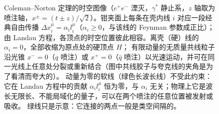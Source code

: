 \begin{figure}[htbp]
\begin{tikzpicture}
\end{tikzpicture}
\caption{Coleman--Norton 定理的时空图像（$e^+e^-$ 湮灭，$\gamma^*$ 静止系，$z$ 轴取为喷注轴，$x^\pm=(t\pm z)/\sqrt2$）。钳夹面上每条在壳内线 $i$
对应一段经典自由传播 $\Delta x_i^\mu=\alpha_i l_i^\mu$（$\alpha_i\ge0$，与该线的 Feynman 参数成正比）；由 Landau 方程，各顶点的时空位置彼此相容。离壳（硬）线的 $\alpha_i=0$，全部收缩为原点处的硬顶点 $H$；
有限动量的无质量共线粒子沿光锥 $x^-=0$（$q$ 喷注）或 $x^+=0$（$\bar q$ 喷注）以光速运动，并可在同一光线上任意处分裂或重新结合（图中共线胶子与夸克线的夹角是为了看清而夸大的）。
动量为零的软线（绿色长波长线）不受此约束：它在 Landau 方程中的贡献 $\alpha_i l_i^\mu$ 恒为零，与 $\alpha_i$ 无关；物理上它是波长无限长、不能局域化的量子，可以在两个喷注的任意位置被发射或吸收。
绿线只是示意：它连接的两点一般是类空间隔的。}
\label{fig:coleman-norton}
\end{figure}

